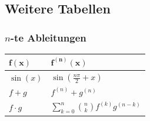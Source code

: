 \documentclass[a4paper,10pt]{article}
\begin{document}
\subsection{Weitere Tabellen}

\subsubsection{$n$-te Ableitungen}
\begin{center}
  \begin{tabularx}{\linewidth}{>{\centering\arraybackslash}X>{\centering\arraybackslash}X}
  \toprule
  $\mathbf{f(x)}$ & $\mathbf{f^{(n)}(x)}$ \\
  \midrule
  $\sin(x)$ & $\sin(\frac{n\pi}{2} + x)$\\
  $f + g$ & $f^{(n)} + g^{(n)}$\\
  $f \cdot g$ & $\sum\limits_{k=0}^{n}\binom{n}{k}f^{(k)}g^{(n-k)}$\\
  \bottomrule
  \end{tabularx}
\end{center}
\end{document}
